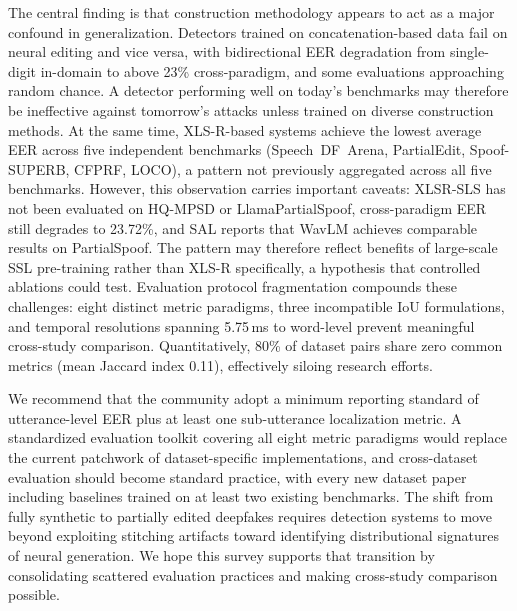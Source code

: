 \documentclass[journal]{IEEEtran}
\begin{document}
The central finding is that construction methodology appears to act as a major confound in generalization. Detectors trained on concatenation-based data fail on neural editing and vice versa, with bidirectional EER degradation from single-digit in-domain to above 23\% cross-paradigm, and some evaluations approaching random chance. A detector performing well on today's benchmarks may therefore be ineffective against tomorrow's attacks unless trained on diverse construction methods. At the same time, XLS-R-based systems achieve the lowest average EER across five independent benchmarks (Speech~DF~Arena, PartialEdit, Spoof-SUPERB, CFPRF, LOCO), a pattern not previously aggregated across all five benchmarks. However, this observation carries important caveats: XLSR-SLS has not been evaluated on HQ-MPSD or LlamaPartialSpoof, cross-paradigm EER still degrades to 23.72\%, and SAL reports that WavLM achieves comparable results on PartialSpoof. The pattern may therefore reflect benefits of large-scale SSL pre-training rather than XLS-R specifically, a hypothesis that controlled ablations could test. Evaluation protocol fragmentation compounds these challenges: eight distinct metric paradigms, three incompatible IoU formulations, and temporal resolutions spanning 5.75\,ms to word-level prevent meaningful cross-study comparison. Quantitatively, 80\% of dataset pairs share zero common metrics (mean Jaccard index 0.11), effectively siloing research efforts.

We recommend that the community adopt a minimum reporting standard of utterance-level EER plus at least one sub-utterance localization metric. A standardized evaluation toolkit covering all eight metric paradigms would replace the current patchwork of dataset-specific implementations, and cross-dataset evaluation should become standard practice, with every new dataset paper including baselines trained on at least two existing benchmarks. The shift from fully synthetic to partially edited deepfakes requires detection systems to move beyond exploiting stitching artifacts toward identifying distributional signatures of neural generation. We hope this survey supports that transition by consolidating scattered evaluation practices and making cross-study comparison possible.




\end{document}
